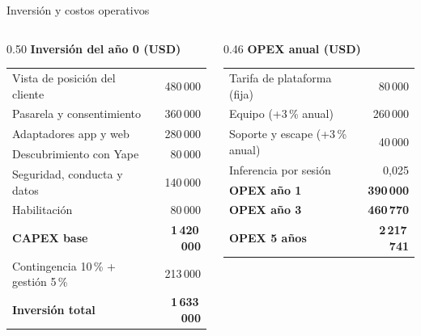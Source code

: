 \documentclass[aspectratio=169,11pt]{beamer}
\begin{document}
\begin{frame}{Inversión y costos operativos}
\vspace{0.02cm}
\begin{columns}[T]
\begin{column}{0.50\textwidth}
{\color{bcp}\bfseries Inversión del año 0 (USD)}
\vspace{0.1cm}

\scriptsize
\begin{tabular}{p{4.3cm}r}
\toprule
Vista de posición del cliente & 480\,000 \\
Pasarela y consentimiento & 360\,000 \\
Adaptadores app y web & 280\,000 \\
Descubrimiento con Yape & 80\,000 \\
Seguridad, conducta y datos & 140\,000 \\
Habilitación & 80\,000 \\
\midrule
\textbf{CAPEX base} & \textbf{1\,420\,000} \\
Contingencia 10\,\% + gestión 5\,\% & 213\,000 \\
\textbf{Inversión total} & \textbf{1\,633\,000} \\
\bottomrule
\end{tabular}
\end{column}
\begin{column}{0.46\textwidth}
{\color{cobre}\bfseries OPEX anual (USD)}
\vspace{0.1cm}

\scriptsize
\begin{tabular}{p{3.3cm}r}
\toprule
Tarifa de plataforma (fija) & 80\,000 \\
Equipo (+3\,\% anual) & 260\,000 \\
Soporte y escape (+3\,\% anual) & 40\,000 \\
Inferencia por sesión & 0,025 \\
\midrule
\textbf{OPEX año 1} & \textbf{390\,000} \\
\textbf{OPEX año 3} & \textbf{460\,770} \\
\textbf{OPEX 5 años} & \textbf{2\,217\,741} \\
\bottomrule
\end{tabular}
\end{column}
\end{columns}
\end{frame}
\end{document}
